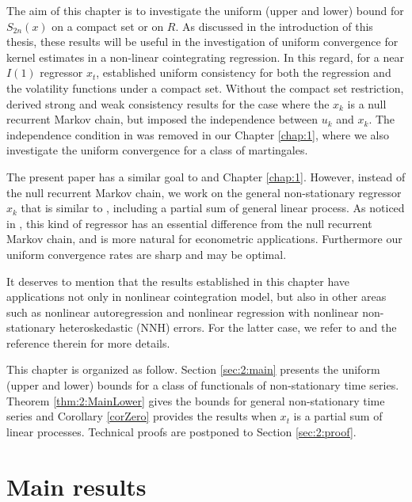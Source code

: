 The aim of this chapter is to investigate the uniform (upper and lower) bound  for $S_{2n}(x)$ on a compact set or on $R$. As discussed in the introduction of this thesis, these results will be useful in the investigation of uniform convergence for kernel estimates in a non-linear cointegrating regression. In this regard, for a near $I(1)$ regressor $x_t$, \cite{wangwang2012} established uniform consistency for  both the regression and the volatility functions under  a compact set. Without the compact set restriction,  \cite{gaolitjostheim2011} derived strong and weak consistency results for the case where the $x_k$ is a null recurrent Markov chain,  but  imposed the independence between $u_k$ and $x_k$. The independence condition in \cite{gaolitjostheim2011} was removed in our Chapter \ref{chap:1}, where we also investigate the uniform convergence for a class of martingales.

 The present paper has a similar goal to \cite{gaolitjostheim2011} and Chapter \ref{chap:1}. However, instead of the null recurrent Markov chain, we work on the
  general non-stationary regressor $x_k$ that is similar to \cite{wangphillips2010a}, including a partial sum of general linear process. As noticed in \cite{wangphillips2010a}, this kind of regressor has an essential difference from the null recurrent Markov chain, and is more natural for econometric applications. Furthermore  our uniform convergence rates are sharp and may be optimal.

 It deserves to mention that the results established in this chapter have applications not only in nonlinear cointegration model, but also in other areas such as nonlinear autoregression and  nonlinear regression with nonlinear non-stationary heteroskedastic (NNH) errors. For the latter case, we refer to \cite{wangwang2012} and the reference therein for more details.

This chapter is organized as follow. Section \ref{sec:2:main} presents the uniform (upper and lower) bounds for a class of functionals  of non-stationary time series. Theorem \ref{thm:2:MainLower} gives the bounds for general non-stationary time series and Corollary \ref{corZero} provides the results when $x_t$ is a partial sum of linear processes. Technical proofs are postponed to Section \ref{sec:2:proof}.

\section{Main results} 

